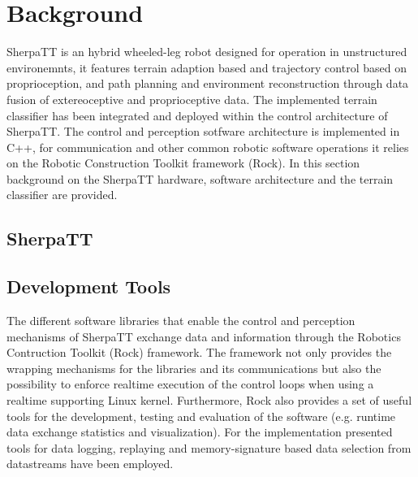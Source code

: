 \documentclass{article}
\begin{document}

\section{Background}


SherpaTT is an hybrid wheeled-leg robot designed for operation in unstructured environemnts, it features terrain adaption based and trajectory control based on proprioception, and path planning and environment reconstruction through data fusion of extereoceptive and proprioceptive data.
The implemented terrain classifier has been integrated and deployed within the control architecture of SherpaTT. 
The control and perception sotfware architecture is implemented in C++, for communication and other common robotic software operations it relies on the Robotic Construction Toolkit framework (Rock). 
In this section background on the SherpaTT hardware, software architecture and the terrain classifier are provided.


\subsection{SherpaTT}


\subsection{Development Tools}

The different software libraries that enable the control and perception mechanisms of SherpaTT exchange data and information through the Robotics Contruction Toolkit (Rock) framework.
The framework not only provides the wrapping mechanisms for the libraries and its communications but also the possibility to enforce realtime execution of the control loops when using a realtime supporting Linux kernel.
Furthermore, Rock also provides a set of useful tools for the development, testing and evaluation of the software (e.g. runtime data exchange statistics and visualization). 
For the implementation presented tools for data logging, replaying and memory-signature based data selection from datastreams have been employed.
\end{document}
